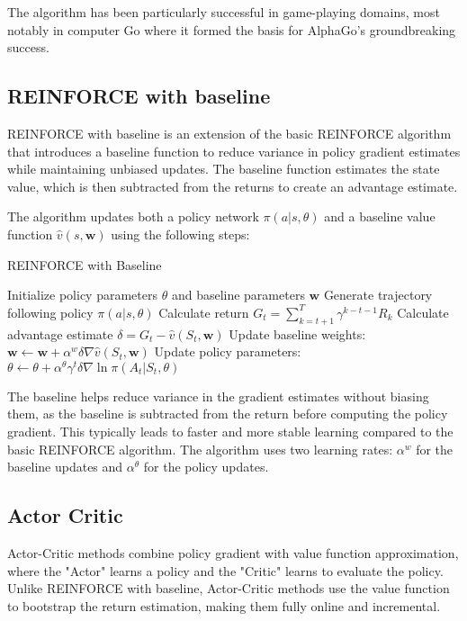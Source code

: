 \documentclass{article}
\begin{document}
The algorithm has been particularly successful in game-playing domains, most notably in computer Go where it formed the basis for AlphaGo's groundbreaking success.

\subsection{REINFORCE with baseline}

REINFORCE with baseline is an extension of the basic REINFORCE algorithm that introduces a baseline function to reduce variance in policy gradient estimates while maintaining unbiased updates.
The baseline function estimates the state value, which is then subtracted from the returns to create an advantage estimate.

The algorithm updates both a policy network $\pi(a|s,\theta)$ and a baseline value function $\hat{v}(s,\mathbf{w})$ using the following steps:

\begin{algorithm}
\caption{REINFORCE with Baseline}
\begin{algorithmic}[1]
\State Initialize policy parameters $\theta$ and baseline parameters $\mathbf{w}$
    \State Generate trajectory following policy $\pi(a|s,\theta)$
        \State Calculate return $G_t = \sum_{k=t+1}^T \gamma^{k-t-1}R_k$
        \State Calculate advantage estimate $\delta = G_t - \hat{v}(S_t,\mathbf{w})$
        \State Update baseline weights: $\mathbf{w} \leftarrow \mathbf{w} + \alpha^w \delta \nabla \hat{v}(S_t,\mathbf{w})$
        \State Update policy parameters: $\theta \leftarrow \theta + \alpha^\theta \gamma^t \delta \nabla \ln \pi(A_t|S_t,\theta)$
    \EndFor
\EndFor
\end{algorithmic}
\end{algorithm}

The baseline helps reduce variance in the gradient estimates without biasing them, as the baseline is subtracted from the return before computing the policy gradient.
This typically leads to faster and more stable learning compared to the basic REINFORCE algorithm. 
The algorithm uses two learning rates: $\alpha^w$ for the baseline updates and $\alpha^\theta$ for the policy updates.

\subsection{Actor Critic}

Actor-Critic methods combine policy gradient with value function approximation, where the "Actor" learns a policy and the "Critic" learns to evaluate the policy. Unlike REINFORCE with baseline, Actor-Critic methods use the value function to bootstrap the return estimation, making them fully online and incremental.
\end{document}
